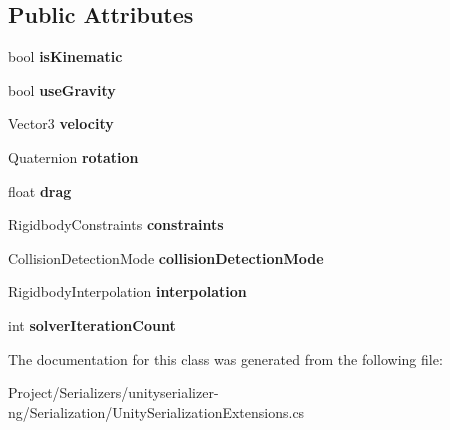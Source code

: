 \subsection*{Public Attributes}
\begin{DoxyCompactItemize}
\item 
\mbox{\label{class_serialize_rigid_body_1_1_rigid_body_info_ae4d274291824c57f9d225e92ef1edd8d}} 
bool {\bfseries is\+Kinematic}
\item 
\mbox{\label{class_serialize_rigid_body_1_1_rigid_body_info_af6f26eebc08d81405ee2e7b37cfb2eee}} 
bool {\bfseries use\+Gravity}
\item 
\mbox{\label{class_serialize_rigid_body_1_1_rigid_body_info_a07a18b9ed30158bf30e0b4bf4d72db51}} 
Vector3 {\bfseries velocity}
\item 
\mbox{\label{class_serialize_rigid_body_1_1_rigid_body_info_ad468967fbc9ee897b5fa054a0cf5df30}} 
Quaternion {\bfseries rotation}
\item 
\mbox{\label{class_serialize_rigid_body_1_1_rigid_body_info_a9a20a62a11a380d01a338d2ea2df3386}} 
float {\bfseries drag}
\item 
\mbox{\label{class_serialize_rigid_body_1_1_rigid_body_info_a38479b3970e04a64c1fa5d14c741e08d}} 
Rigidbody\+Constraints {\bfseries constraints}
\item 
\mbox{\label{class_serialize_rigid_body_1_1_rigid_body_info_ad2044aa495406045b261545eca0e29b3}} 
Collision\+Detection\+Mode {\bfseries collision\+Detection\+Mode}
\item 
\mbox{\label{class_serialize_rigid_body_1_1_rigid_body_info_a06a8f1e35a4e5fdf1d7024b3e5087cda}} 
Rigidbody\+Interpolation {\bfseries interpolation}
\item 
\mbox{\label{class_serialize_rigid_body_1_1_rigid_body_info_a7fd02a3a26ebce962854c85f2344fdc0}} 
int {\bfseries solver\+Iteration\+Count}
\end{DoxyCompactItemize}


The documentation for this class was generated from the following file\+:\begin{DoxyCompactItemize}
\item 
Project/\+Serializers/unityserializer-\/ng/\+Serialization/Unity\+Serialization\+Extensions.\+cs\end{DoxyCompactItemize}
